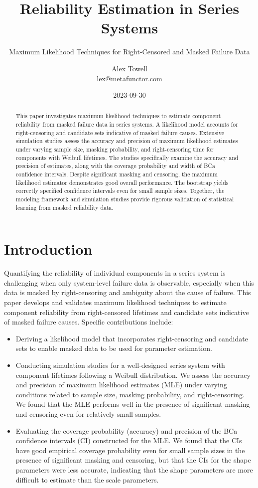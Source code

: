 \documentclass[
]{article}
\title{Reliability Estimation in Series Systems}
\subtitle{Maximum Likelihood Techniques for Right-Censored and Masked Failure Data}
\author{\texorpdfstring{
  \Large{Alex Towell} \\
  \href{mailto:lex@metafunctor.com}{lex@metafunctor.com}
}{Alex Towell}}
\date{2023-09-30}
\theoremstyle{definition}
\theoremstyle{plain}
\theoremstyle{definition}
\theoremstyle{definition}
\theoremstyle{definition}
\theoremstyle{definition}
\theoremstyle{remark}
\begin{document}
\maketitle
\begin{abstract}
This paper investigates maximum likelihood techniques to estimate component reliability from masked failure data in series systems. A likelihood model accounts for right-censoring and candidate sets indicative of masked failure causes. Extensive simulation studies assess the accuracy and precision of maximum likelihood estimates under varying sample size, masking probability, and right-censoring time for components with Weibull lifetimes. The studies specifically examine the accuracy and precision of estimates, along with the coverage probability and width of BCa confidence intervals. Despite significant masking and censoring, the maximum likelihood estimator demonstrates good overall performance. The bootstrap yields correctly specified confidence intervals even for small sample sizes. Together, the modeling framework and simulation studies provide rigorous validation of statistical learning from masked reliability data.
\end{abstract}

{
\setcounter{tocdepth}{2}
\tableofcontents
}
\hypertarget{introduction}{%
\section{Introduction}\label{introduction}}

Quantifying the reliability of individual components in a series system
\citep{Agustin-2011} is challenging when only system-level failure data is
observable, especially when this data is masked by right-censoring and ambiguity
about the cause of failure. This paper develops and validates maximum likelihood
techniques to estimate component reliability from right-censored lifetimes and
candidate sets indicative of masked failure causes. Specific contributions
include:

\begin{itemize}
\item
  Deriving a likelihood model that incorporates right-censoring and candidate
  sets to enable masked data to be used for parameter estimation.
\item
  Conducting simulation studies for a well-designed series system with component
  lifetimes following a Weibull distribution. We assess the accuracy and precision
  of maximum likelihood estimates (MLE) under varying conditions related to sample
  size, masking probability, and right-censoring. We found that the MLE performs
  well in the presence of significant masking and censoring even for relatively small
  samples.
\item
  Evaluating the coverage probability (accuracy) and precision of the BCa
  confidence intervals (CI) constructed for the MLE. We found that the CIs have
  good empirical coverage probability even for small sample sizes in the presence of
  significant masking and censoring, but that the CIs for the shape parameters
  were less accurate, indicating that the shape parameters are more difficult to
  estimate than the scale parameters.
\end{itemize}
\end{document}
